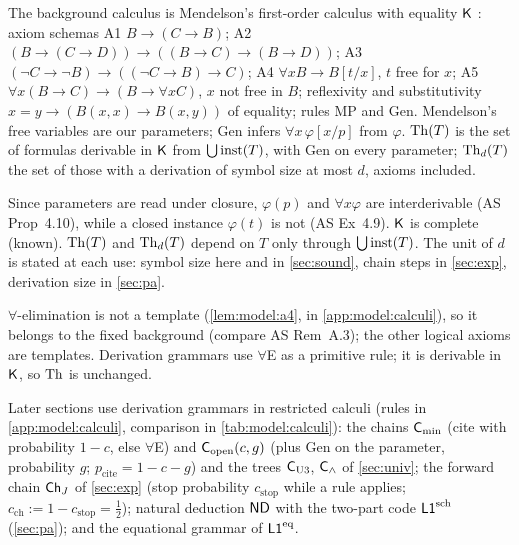 \begin{definition}\label{def:model:calculus}
The background calculus is Mendelson's first-order calculus with equality $\mathsf{K}$ \citep[Ch.~2; chapter and numbering not checked]{mendelson1997introduction}: axiom schemas A1 $B\to(C\to B)$; A2 $(B\to(C\to D))\to((B\to C)\to(B\to D))$; A3 $(\neg C\to\neg B)\to((\neg C\to B)\to C)$; A4 $\forall x B\to B[t/x]$, $t$ free for $x$; A5 $\forall x(B\to C)\to(B\to\forall xC)$, $x$ not free in $B$; reflexivity and substitutivity $x=y\to(B(x,x)\to B(x,y))$ of equality; rules MP and Gen. Mendelson's free variables are our parameters; Gen infers $\forall x\,\varphi[x/p]$ from $\varphi$. $\mathrm{Th}(T)$ is the set of formulas derivable in $\mathsf{K}$ from $\bigcup\mathrm{inst}(T)$, with Gen on every parameter; $\mathrm{Th}_d(T)$ the set of those with a derivation of symbol size at most $d$, axioms included.
\end{definition}

Since parameters are read under closure, $\varphi(p)$ and $\forall x\varphi$ are interderivable (AS Prop~4.10), while a closed instance $\varphi(t)$ is not (AS Ex~4.9). $\mathsf{K}$ is complete (known). $\mathrm{Th}(T)$ and $\mathrm{Th}_d(T)$ depend on $T$ only through $\bigcup\mathrm{inst}(T)$. The unit of $d$ is stated at each use: symbol size here and in \cref{sec:sound}, chain steps in \cref{sec:exp}, derivation size in \cref{sec:pa}.

$\forall$-elimination is not a template (\cref{lem:model:a4}, in \cref{app:model:calculi}), so it belongs to the fixed background (compare AS Rem~A.3); the other logical axioms are templates. Derivation grammars use $\forall$E as a primitive rule; it is derivable in $\mathsf{K}$, so $\mathrm{Th}$ is unchanged.

\begin{definition}\label{def:model:calculi}
Later sections use derivation grammars in restricted calculi (rules in \cref{app:model:calculi}, comparison in \cref{tab:model:calculi}): the chains $\mathsf{C}_{\min}$ (cite with probability $1-c$, else $\forall$E) and $\mathsf{C}_{\mathrm{open}}(c,g)$ (plus Gen on the parameter, probability $g$; $p_{\mathrm{cite}}=1-c-g$) and the trees $\mathsf{C}_{\mathrm{U3}}$, $\mathsf{C}_{\wedge}$ of \cref{sec:univ}; the forward chain $\mathsf{Ch}_{J}$ of \cref{sec:exp} (stop probability $c_{\mathrm{stop}}$ while a rule applies; $c_{\mathrm{ch}}:=1-c_{\mathrm{stop}}=\tfrac12$); natural deduction $\mathsf{ND}$ with the two-part code $\mathord{\mathsf{L1}}^{\mathrm{sch}}$ (\cref{sec:pa}); and the equational grammar of $\mathord{\mathsf{L1}}^{\mathrm{eq}}$.
\end{definition}

